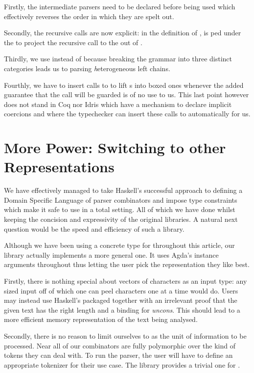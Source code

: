 Firstly, the intermediate parsers need to be declared before being used which effectively
reverses the order in which they are spelt out.

Secondly, the recursive calls
are now explicit: in the definition of ,  is ped
under the \BOX{} to project the recursive call to the   out
of .

Thirdly, we use  instead of  because
breaking the grammar into three distinct categories leads us to parsing
\emph{h}eterogeneous left chains.

Fourthly, we have to insert calls to 
to lift s into boxed ones whenever the added guarantee that the call
will be guarded is of no use to us. This last point however does not stand in
Coq nor Idris which have a mechanism to declare implicit coercions and where the
typechecker can insert these calls to  automatically for us.

\section{More Power: Switching to other Representations}

We have effectively managed to take Haskell's successful approach to defining
a Domain Specific Language of parser combinators and impose type constraints
which make it safe to use in a total setting. All of which we have done whilst
keeping the concision and expressivity of the original libraries. A natural
next question would be the speed and efficiency of such a library.

Although we have been using a concrete type for  throughout
this article, our library actually implements a more general one. It uses
Agda's instance arguments throughout thus letting the user pick the
representation they like best.

Firstly, there is nothing special about vectors of characters as an input
type: any sized input off of which one can peel characters one at a time
would do. Users may instead use Haskell's  packaged together
with an irrelevant proof that the given text has the right length and a
binding for \textit{uncons}. This should lead to a more efficient memory
representation of the text being analysed.

Secondly, there is no reason to limit ourselves to  as the
unit of information to be processed. Near all of our combinators are
fully polymorphic over the kind of tokens they can deal with. To run
the parser, the user will have to define an appropriate tokenizer for
their use case. The library provides a trivial one for .

